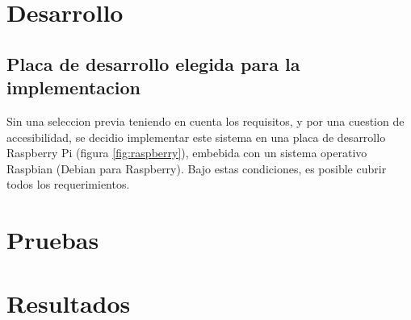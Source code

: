 
\section{Desarrollo} %
\label{sec:desarrollo}

\subsection{Placa de desarrollo elegida para la implementacion} %
\label{sub:placa_de_desarrollo_elegida_para_la_implementacion}

Sin una seleccion previa teniendo en cuenta los requisitos, y por una cuestion de accesibilidad, se decidio implementar este sistema en una placa de desarrollo Raspberry Pi (figura \ref{fig:raspberry}), embebida con un sistema operativo Raspbian (Debian para Raspberry). Bajo estas condiciones, es posible cubrir todos los requerimientos.



\section{Pruebas} %
\label{sec:pruebas}


\section{Resultados} %
\label{sec:resultados}


